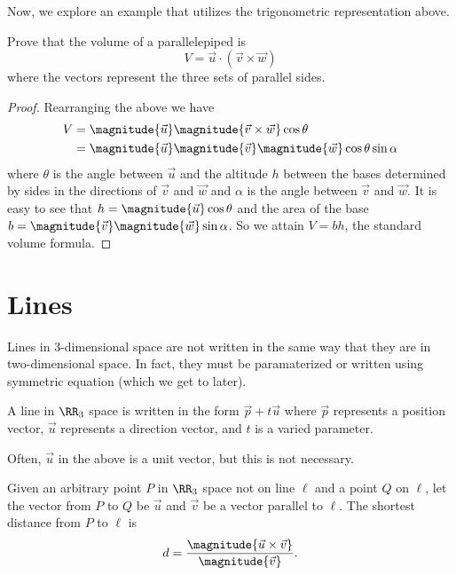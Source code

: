 Now, we explore an example that utilizes the trigonometric representation above.

\begin{example}
    Prove that the volume of a parallelepiped is
    \[V = \vec{u} \cdot (\vec{v} \times \vec{w})\]
    where the vectors represent the three sets of parallel sides.

    \begin{proof}
        Rearranging the above we have
        \begin{align*}
            V &= \magnitude{\vec{u}} \magnitude{\vec{v} \times \vec{w}} \cos\theta \\
            &= \magnitude{\vec{u}} \magnitude{\vec{v}} \magnitude{\vec{w}} \cos\theta \sin\alpha
        \end{align*}
        where $\theta$ is the angle between $\vec{u}$ and the altitude $h$ between the bases determined by sides in the directions of $\vec{v}$ and $\vec{w}$ and $\alpha$ is the angle between $\vec{v}$ and $\vec{w}$. It is easy to see that $h = \magnitude{\vec{u}}\cos\theta$ and the area of the base $b = \magnitude{\vec{v}} \magnitude{\vec{w}} \sin\alpha$. So we attain $V = bh$, the standard volume formula.
    \end{proof}
\end{example}

\section{Lines}

Lines in 3-dimensional space are not written in the same way that they are in two-dimensional space. In fact, they must be paramaterized or written using symmetric equation (which we get to later).

\begin{definition}
    A line in $\RR_{3}$ space is written in the form $\vec{p} + t\vec{u}$ where $\vec{p}$ represents a position vector, $\vec{u}$ represents a direction vector, and $t$ is a varied parameter.
\end{definition}

\begin{remark}
    Often, $\vec{u}$ in the above is a unit vector, but this is not necessary.
\end{remark}

\begin{theorem}
    Given an arbitrary point $P$ in $\RR_{3}$ space not on line $\ell$ and a point $Q$ on $\ell$, let the vector from $P$ to $Q$ be $\vec{u}$ and $\vec{v}$ be a vector parallel to $\ell$. The shortest distance from $P$ to $\ell$ is
    \[d = \frac{\magnitude{\vec{u} \times \vec{v}}}{\magnitude{\vec{v}}}.\]
\end{theorem}

